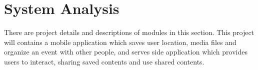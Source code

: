 \chapter{System Analysis}
There are project details and descriptions of modules in this section.
This project will contains a mobile application which saves user location, media files and organize an event with other people, and serves side application which provides users to interact, sharing saved contents and use shared contents. 

